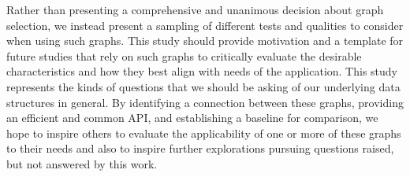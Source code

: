 Rather than presenting a comprehensive and unanimous decision about graph selection, we instead present a sampling of different tests and qualities to consider when using such graphs.
%
This study should provide motivation and a template for future studies that rely on such graphs to critically evaluate the desirable characteristics and how they best align with needs of the application.
%
This study represents the kinds of questions that we should be asking of our underlying data structures in general.
%
By identifying a connection between these graphs, providing an efficient and common API, and establishing a baseline for comparison, we hope to inspire others to evaluate the applicability of one or more of these graphs to their needs and also to inspire further explorations pursuing questions raised, but not answered by this work.